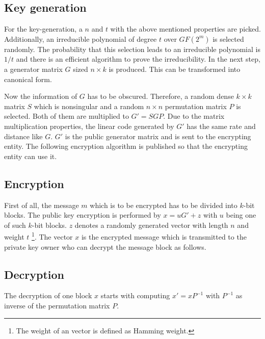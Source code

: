 \subsection*{Key generation}
For the key-generation, a $n$ and $t$ with the above mentioned properties are picked. Additionally, an irreducible polynomial of degree $t$ over $GF(2^m)$  is selected randomly. The probability that this selection leads to an irreducible polynomial is $1/t$ and there is an efficient algorithm to prove the irreducibility\cite{berlekamp1968algebraic}.
In the next step, a generator matrix $G$ sized $n \times k$ is produced. This can be transformed into canonical form. 

Now the information of $G$ has to be obscured. Therefore, a random dense $k \times k$ matrix $S$ which is nonsingular and a random $n \times n$ permutation matrix $P$ is selected. Both of them are multiplied to $G' = SGP$. Due to the matrix multiplication properties, the linear code generated by $G'$ has the same rate and distance like $G$. $G'$ is the public generator matrix and is sent to the encrypting entity. 
\newline
\newline
The following encryption algorithm is published so that the encrypting entity can use it. 

\subsection*{Encryption}
First of all, the message $m$ which is to be encrypted has to be divided into $k$-bit blocks. The public key encryption is performed by $x = uG' + z$ with $u$ being one of such $k$-bit blocks. $z$ denotes a randomly generated vector with length $n$ and weight $t$ \footnote{The weight of an vector is defined as Hamming weight.}.
\newline
\newline
The vector $x$ is the encrypted message which is transmitted to the private key owner who can decrypt the message block as follows. 

\subsection*{Decryption}
The decryption of one block $x$ starts with computing $x' = xP^{-1}$ with $P^{-1}$ as inverse of the permutation matrix $P$. 

